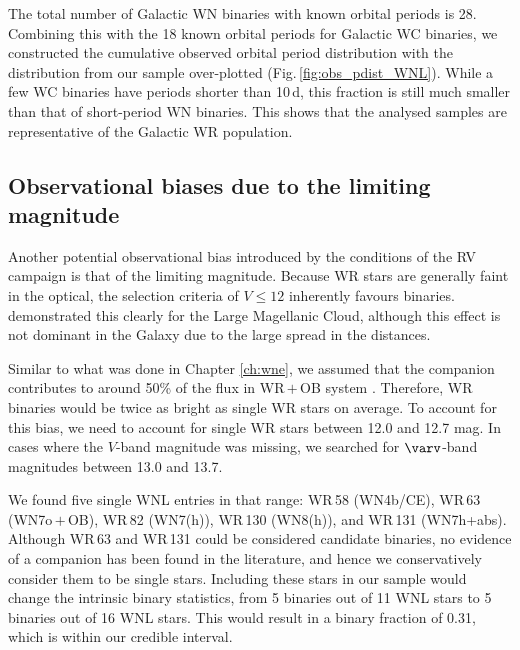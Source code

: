 The total number of Galactic WN binaries with known orbital periods is 28. Combining this with the 18 known orbital periods for Galactic WC binaries, we constructed the cumulative observed orbital period distribution with the distribution from our sample over-plotted (Fig.\,\ref{fig:obs_pdist_WNL}). While a few WC binaries have periods shorter than 10\,d, this fraction is still much smaller than that of short-period WN binaries. This shows that the analysed samples are representative of the Galactic WR population.
\subsection{Observational biases due to the limiting magnitude}  \label{sect:mag}
Another potential observational bias introduced by the conditions of the RV campaign is that of the limiting magnitude. Because WR stars are generally faint in the optical, the selection criteria of $V\le12$ inherently favours binaries. \citet{vanbeveren_binary_1980} demonstrated this clearly for the Large Magellanic Cloud, although this effect is not dominant in the Galaxy due to the large spread in the distances.

Similar to what was done in Chapter \ref{ch:wne}, we assumed that the companion contributes to around 50\% of the flux in WR\,$+$\,OB system \citep[e.g.,][]{shenar_wolf-rayet_2019}. Therefore, WR binaries would be twice as bright as single WR stars on average. To account for this bias, we need to account for single WR stars between 12.0 and 12.7 mag. In cases where the $V$-band magnitude was missing, we searched for $\varv$-band magnitudes between 13.0 and 13.7.

We found five single WNL entries in that range: WR\,58 (WN4b/CE), WR\,63 (WN7o\,$+$\,OB), WR\,82 (WN7(h)), WR\,130 (WN8(h)), and WR\,131 (WN7h+abs). Although WR\,63 and WR\,131 could be considered candidate binaries, no evidence of a companion has been found in the literature, and hence we conservatively consider them to be single stars. Including these stars in our sample would change the intrinsic binary statistics, from 5 binaries out of 11 WNL stars to 5 binaries out of 16 WNL stars. This would result in a binary fraction of 0.31, which is within our credible interval.
